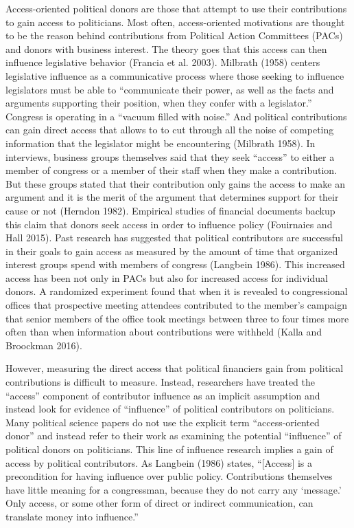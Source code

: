 \documentclass[12pt,]{article}
\begin{document}
Access-oriented political donors are those that attempt to use their
contributions to gain access to politicians. Most often, access-oriented
motivations are thought to be the reason behind contributions from
Political Action Committees (PACs) and donors with business interest.
The theory goes that this access can then influence legislative behavior
(Francia et al. 2003). Milbrath (1958) centers legislative influence as
a communicative process where those seeking to influence legislators
must be able to ``communicate their power, as well as the facts and
arguments supporting their position, when they confer with a
legislator.'' Congress is operating in a ``vacuum filled with noise.''
And political contributions can gain direct access that allows to to cut
through all the noise of competing information that the legislator might
be encountering (Milbrath 1958). In interviews, business groups
themselves said that they seek ``access'' to either a member of congress
or a member of their staff when they make a contribution. But these
groups stated that their contribution only gains the access to make an
argument and it is the merit of the argument that determines support for
their cause or not (Herndon 1982). Empirical studies of financial
documents backup this claim that donors seek access in order to
influence policy (Fouirnaies and Hall 2015). Past research has suggested
that political contributors are successful in their goals to gain access
as measured by the amount of time that organized interest groups spend
with members of congress (Langbein 1986). This increased access has been
not only in PACs but also for increased access for individual donors. A
randomized experiment found that when it is revealed to congressional
offices that prospective meeting attendees contributed to the member's
campaign that senior members of the office took meetings between three
to four times more often than when information about contributions were
withheld (Kalla and Broockman 2016).

However, measuring the direct access that political financiers gain from
political contributions is difficult to measure. Instead, researchers
have treated the ``access'' component of contributor influence as an
implicit assumption and instead look for evidence of ``influence'' of
political contributors on politicians. Many political science papers do
not use the explicit term ``access-oriented donor'' and instead refer to
their work as examining the potential ``influence'' of political donors
on politicians. This line of influence research implies a gain of access
by political contributors. As Langbein (1986) states, ``{[}Access{]} is
a precondition for having influence over public policy. Contributions
themselves have little meaning for a congressman, because they do not
carry any `message.' Only access, or some other form of direct or
indirect communication, can translate money into influence.''
\end{document}
